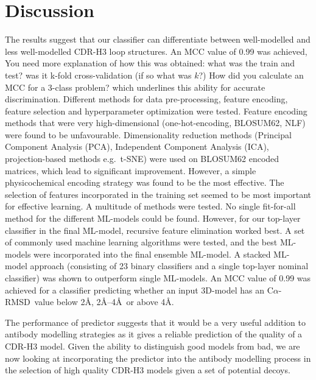 \documentclass[12pt]{article}
\newcommand{\carmsd}{\mbox{C$\alpha$-RMSD}}
\newcommand{\lilian}[1]{ {\color{red}{\bfseries Lilian:} #1}}
\begin{document}
\section{Discussion}
The results suggest that our classifier can differentiate
between well-modelled and less well-modelled CDR-H3 loop
structures. An MCC value of 0.99 was achieved,
\lilian{You need more explanation of how this was obtained:
  what was the train and test? was it k-fold cross-validation
  (if so what was $k$?) How did you calculate an MCC for a
  3-class problem?}
which underlines this
ability for accurate discrimination. Different methods for data
pre-processing, feature encoding, feature selection and hyperparameter
optimization were tested.
Feature encoding methods that were very high-dimensional
(one-hot-encoding, BLOSUM62, NLF) were found to be
unfavourable. Dimensionality reduction methods (Principal Component
Analysis (PCA), Independent Component Analysis (ICA), projection-based
methods e.g.\ t-SNE) were used on BLOSUM62 encoded matrices, which lead
to significant improvement. However, a simple physicochemical encoding
strategy was found to be the most effective.
The selection of features incorporated in the training set seemed to
be most important for effective learning. A multitude of methods were
tested. No single fit-for-all method for the different ML-models could be
found. However, for our top-layer classifier in the final ML-model,
recursive feature elimination worked best.
A set of commonly used machine learning algorithms were tested, and
the best ML-models were incorporated into the final ensemble ML-model. A
stacked ML-model approach (consisting of 23 binary classifiers and a
single top-layer nominal classifier) was shown to outperform single
ML-models.
An MCC value of 0.99 was achieved for a classifier predicting whether
an input 3D-model has an \carmsd\ value below 2\AA, 2\AA--4\AA\ or above
4\AA.

The performance of predictor suggests that it would be a very useful
addition to antibody modelling strategies as it gives a reliable
prediction of the quality of a CDR-H3 model. Given the ability to
distinguish good models from bad, we are now looking at incorporating
the predictor into the antibody modelling process in the selection of
high quality CDR-H3 models given a set of potential decoys.


\end{document}
